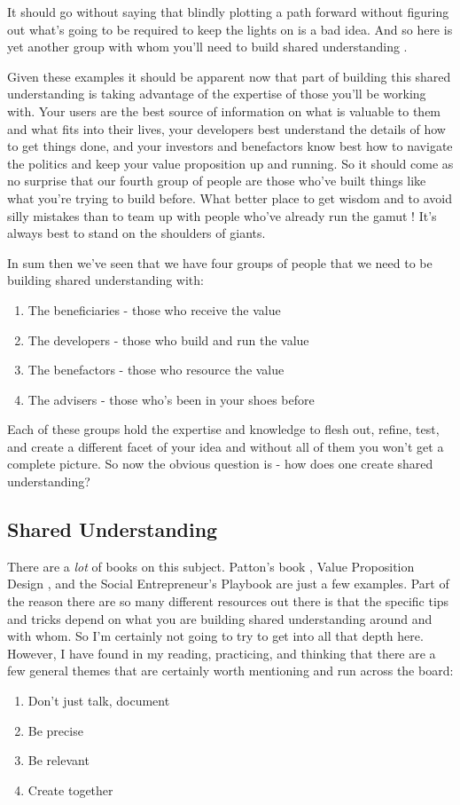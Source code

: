 \documentclass[11pt,a5paper]{book}
\begin{document}
It should go without saying that blindly plotting a path forward without figuring out what's going to be required to keep the lights on is a bad idea. And so here is yet another group with whom you'll need to build shared understanding \cite{macmillan}. 
\newline

Given these examples it should be apparent now that part of building this shared understanding is taking advantage of the expertise of those you'll be working with. Your users are the best source of information on what is valuable to them and what fits into their lives, your developers best understand the details of how to get things done, and your investors and benefactors know best how to navigate the politics and keep your value proposition up and running. So it should come as no surprise that our fourth group of people are those who've built things like what you're trying to build before. What better place to get wisdom and to avoid silly mistakes than to team up with people who've already run the gamut \cite{macmillan}! It's always best to stand on the shoulders of giants. 
\newline

In sum then we've seen that we have four groups of people that we need to be building shared understanding with:
\begin{enumerate}
\item The beneficiaries - those who receive the value
\item The developers - those who build and run the value
\item The benefactors - those who resource the value
\item The advisers - those who's been in your shoes before
\end{enumerate}  
Each of these groups hold the expertise and knowledge to flesh out, refine, test, and create a different facet of your idea and without all of them you won't get a complete picture. So now the obvious question is - how does one create shared understanding?

\subsection{Shared Understanding}
There are a \textit{lot} of books on this subject. Patton's book \cite{patton}, Value Proposition Design \cite{valueprop}, and the Social Entrepreneur's Playbook \cite{macmillan} are just a few examples. Part of the reason there are so many different resources out there is that the specific tips and tricks depend on what you are building shared understanding around and with whom. So I'm certainly not going to try to get into all that depth here. However, I have found in my reading, practicing, and thinking that there are a few general themes that are certainly worth mentioning and run across the board:
\begin{enumerate}
\item Don't just talk, document
\item Be precise
\item Be relevant
\item Create together
\end{enumerate}
\end{document}
